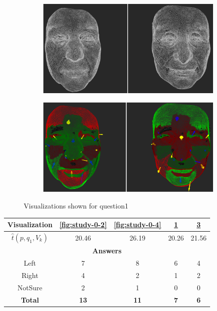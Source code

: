 \begin{figure}[h]
\begin{subfigure}{0.4\textwidth}
\includegraphics[width=\textwidth]{./screenshots/pair1.PNG}
\caption{}
\label{fig:study-0-1}
\end{subfigure}
\quad
\begin{subfigure}{0.4\textwidth}
\includegraphics[width=\textwidth]{./screenshots/pair3.PNG}
\caption{}
\label{fig:study-0-3}
\end{subfigure}
\caption{Visualizations shown for question1}
\end{figure}
\medskip

\begin{center}
\begin{tabular}{| c | c | c | c | c |}
	\hline
	Visualization & \ref{fig:study-0-2} & \ref{fig:study-0-4} & \ref{fig:study-0-1} & \ref{fig:study-0-3}\\ \hline
	\(\widehat{t}(p, q_1, V_k)\) & 20.46 & 26.19 & 20.26 & 21.56\\ \hline
	\multicolumn{5}{|c|}{\bf Answers} \\ \hline
	Left & 7 & 8 & 6 & 4\\ \hline
	Right & 4 & 2 & 1 & 2\\ \hline
	NotSure & 2 & 1 & 0 & 0\\ \hline
	{\bf Total} & {\bf 13} & {\bf 11} & {\bf 7} & {\bf 6}\\ \hline
\end{tabular}
\end{center}
\clearpage


